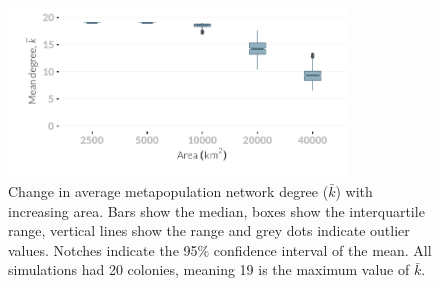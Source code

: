 \begin{knitrout}\footnotesize
{}\color{fgcolor}\begin{figure}[t]

{\centering \includegraphics[width=0.8\textwidth]{figure/plotK-1} 

}

\caption[Change in average network degree with increasing area]{
Change in average metapopulation network degree ($\bar{k}$) with increasing area. 
Bars show the median, boxes show the interquartile range, vertical lines show the range and grey dots indicate outlier values.
Notches indicate the 95\% confidence interval of the mean.
All simulations had 20 colonies, meaning 19 is the maximum value of $\bar{k}$.
}\label{fig:plotK}
\end{figure}


\end{knitrout}
















